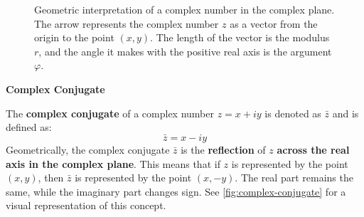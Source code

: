 \begin{figure}[!htp]
    \centering
    \caption{Geometric interpretation of a complex number in the complex plane. The arrow represents the complex number $z$ as a vector from the origin to the point $(x, y)$. The length of the vector is the modulus $r$, and the angle it makes with the positive real axis is the argument $\varphi$.}
\end{figure}

\newpage

\begin{flushleft}
    \textcolor{Green3}{ \textbf{Complex Conjugate}}
\end{flushleft}
The \textbf{complex conjugate} of a complex number $z = x + iy$ is denoted as $\bar{z}$ and is defined as:
\begin{equation*}
    \bar{z} = x - iy
\end{equation*}
Geometrically, the complex conjugate $\bar{z}$ is the \textbf{reflection} of $z$ \textbf{across the real axis in the complex plane}. This means that if $z$ is represented by the point $(x, y)$, then $\bar{z}$ is represented by the point $(x, -y)$. The real part remains the same, while the imaginary part changes sign. See \autoref{fig:complex-conjugate} for a visual representation of this concept.

